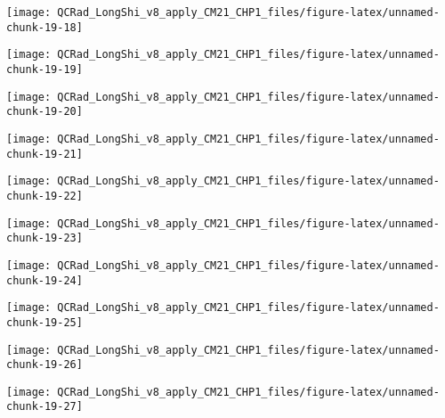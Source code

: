 \documentclass[
  10pt,
  a4paper,oneside]{article}
\begin{document}
\begin{center}\texttt{[image: QCRad\_LongShi\_v8\_apply\_CM21\_CHP1\_files/figure-latex/unnamed-chunk-19-18]} \end{center}

\begin{center}\texttt{[image: QCRad\_LongShi\_v8\_apply\_CM21\_CHP1\_files/figure-latex/unnamed-chunk-19-19]} \end{center}

\begin{center}\texttt{[image: QCRad\_LongShi\_v8\_apply\_CM21\_CHP1\_files/figure-latex/unnamed-chunk-19-20]} \end{center}

\begin{center}\texttt{[image: QCRad\_LongShi\_v8\_apply\_CM21\_CHP1\_files/figure-latex/unnamed-chunk-19-21]} \end{center}

\begin{center}\texttt{[image: QCRad\_LongShi\_v8\_apply\_CM21\_CHP1\_files/figure-latex/unnamed-chunk-19-22]} \end{center}

\begin{center}\texttt{[image: QCRad\_LongShi\_v8\_apply\_CM21\_CHP1\_files/figure-latex/unnamed-chunk-19-23]} \end{center}

\begin{center}\texttt{[image: QCRad\_LongShi\_v8\_apply\_CM21\_CHP1\_files/figure-latex/unnamed-chunk-19-24]} \end{center}

\begin{center}\texttt{[image: QCRad\_LongShi\_v8\_apply\_CM21\_CHP1\_files/figure-latex/unnamed-chunk-19-25]} \end{center}

\begin{center}\texttt{[image: QCRad\_LongShi\_v8\_apply\_CM21\_CHP1\_files/figure-latex/unnamed-chunk-19-26]} \end{center}

\begin{center}\texttt{[image: QCRad\_LongShi\_v8\_apply\_CM21\_CHP1\_files/figure-latex/unnamed-chunk-19-27]} \end{center}
\end{document}
